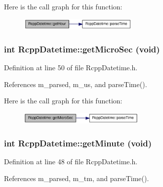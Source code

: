 Here is the call graph for this function:\nopagebreak
\begin{figure}[H]
\begin{center}
\leavevmode
\includegraphics[width=164pt]{classRcppDatetime_a0da8db1ecd235a6e7ab309e70e4e93b0_cgraph}
\end{center}
\end{figure}
\hypertarget{classRcppDatetime_acdf9e19f28c84fde38c352df5f225999}{
\subsubsection[{getMicroSec}]{\setlength{\rightskip}{0pt plus 5cm}int RcppDatetime::getMicroSec (void)}}
\label{classRcppDatetime_acdf9e19f28c84fde38c352df5f225999}


Definition at line 50 of file RcppDatetime.h.

References m\_\-parsed, m\_\-us, and parseTime().

Here is the call graph for this function:\nopagebreak
\begin{figure}[H]
\begin{center}
\leavevmode
\includegraphics[width=174pt]{classRcppDatetime_acdf9e19f28c84fde38c352df5f225999_cgraph}
\end{center}
\end{figure}
\hypertarget{classRcppDatetime_adb41bd524ead66d69e129b1f2767358a}{
\subsubsection[{getMinute}]{\setlength{\rightskip}{0pt plus 5cm}int RcppDatetime::getMinute (void)}}
\label{classRcppDatetime_adb41bd524ead66d69e129b1f2767358a}


Definition at line 48 of file RcppDatetime.h.

References m\_\-parsed, m\_\-tm, and parseTime().


